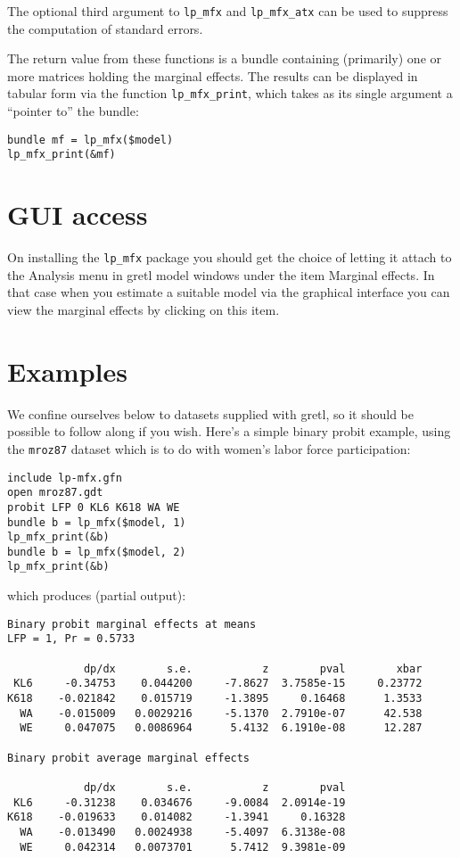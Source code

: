 \documentclass{article}
\begin{document}
The optional third argument to \texttt{lp\_mfx} and
\texttt{lp\_mfx\_atx} can be used to suppress the computation of
standard errors.

The return value from these functions is a bundle containing
(primarily) one or more matrices holding the marginal effects. The
results can be displayed in tabular form via the function
\texttt{lp\_mfx\_print}, which takes as its single argument a
``pointer to'' the bundle:
\begin{verbatim}
bundle mf = lp_mfx($model)
lp_mfx_print(&mf)
\end{verbatim}


\section{GUI access}
\label{sec:gui}

On installing the \texttt{lp\_mfx} package you should get the choice
of letting it attach to the \textsf{Analysis} menu in gretl model
windows under the item \textsf{Marginal effects}. In that case when you
estimate a suitable model via the graphical interface you can view the
marginal effects by clicking on this item.

\section{Examples}
\label{sec:examples}

We confine ourselves below to datasets supplied with gretl, so it
should be possible to follow along if you wish.  Here's a simple
binary probit example, using the \texttt{mroz87} dataset which is to
do with women's labor force participation:

{\small
\begin{verbatim}
include lp-mfx.gfn
open mroz87.gdt
probit LFP 0 KL6 K618 WA WE
bundle b = lp_mfx($model, 1)
lp_mfx_print(&b)
bundle b = lp_mfx($model, 2)
lp_mfx_print(&b)
\end{verbatim}
}
which produces (partial output):
{\small
\begin{verbatim}
Binary probit marginal effects at means
LFP = 1, Pr = 0.5733

            dp/dx        s.e.           z        pval        xbar
 KL6     -0.34753    0.044200     -7.8627  3.7585e-15     0.23772
K618    -0.021842    0.015719     -1.3895     0.16468      1.3533
  WA    -0.015009   0.0029216     -5.1370  2.7910e-07      42.538
  WE     0.047075   0.0086964      5.4132  6.1910e-08      12.287

Binary probit average marginal effects

            dp/dx        s.e.           z        pval
 KL6     -0.31238    0.034676     -9.0084  2.0914e-19
K618    -0.019633    0.014082     -1.3941     0.16328
  WA    -0.013490   0.0024938     -5.4097  6.3138e-08
  WE     0.042314   0.0073701      5.7412  9.3981e-09
\end{verbatim}
}
\end{document}
